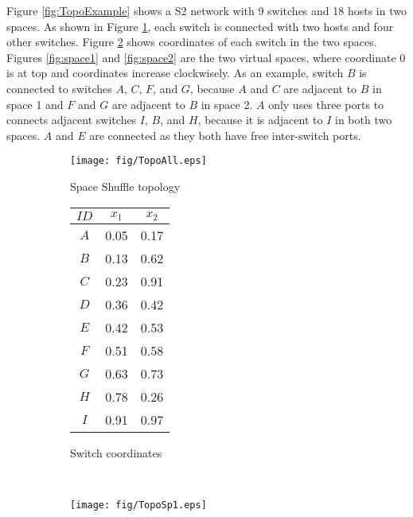 \documentclass[10pt,conference]{IEEEtran}
\begin{document}
Figure \ref{fig:TopoExample} shows a S2 network  with 9 switches and 18 hosts in two spaces.
As shown in  Figure \ref{fig:connect}, each switch is connected with two hosts and four other switches.
Figure \ref{fig:coord} shows coordinates of each switch in the two spaces.
Figures \ref{fig:space1} and \ref{fig:space2} are the two virtual spaces, where coordinate 0 is at top and coordinates increase clockwisely.
As an example, switch $B$ is connected to switches $A$, $C$, $F$, and $G$, because $A$ and $C$ are adjacent to $B$ in space 1 and $F$ and $G$ are adjacent to $B$ in space 2.
$A$ only uses three ports to connects adjacent switches $I$, $B$, and $H$, because it is adjacent to $I$ in both two spaces.
$A$ and $E$ are connected as they both have free inter-switch ports.



\begin{figure}[t]
        \centering
		\begin{subfigure}[b]{0.4\linewidth}
                \texttt{[image: fig/TopoAll.eps]}
                \caption{Space Shuffle topology}
                \label{fig:connect}
        \end{subfigure}
        \begin{subfigure}[b]{0.4\linewidth}
            \centering
			\small
            \begin{tabular}{ccc}
            $ID$ & $x_{1}$ & $x_{2}$ \\ \hline
            $A$ & 0.05 &  0.17 \\
            $B$ & 0.13 &  0.62 \\
            $C$ & 0.23 &  0.91 \\
            $D$ & 0.36& 0.42 \\
            $E$ & 0.42 &  0.53 \\
            $F$ & 0.51 &  0.58 \\
            $G$ & 0.63 &  0.73 \\
            $H$ & 0.78 &  0.26 \\
            $I$ & 0.91 &  0.97 \\ \hline
            \end{tabular}
            \caption{Switch coordinates}
            \label{fig:coord}
        \end{subfigure}
		\\
        \begin{subfigure}[b]{0.4\linewidth}
\texttt{[image: fig/TopoSp1.eps]}
                \vspace{-3ex}

\end{subfigure}
\end{figure}
\end{document}
